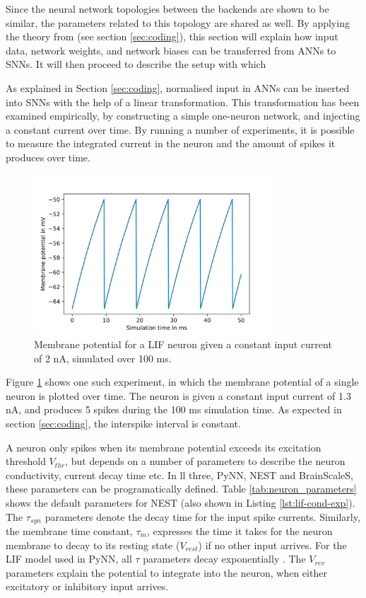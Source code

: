 Since the neural network topologies between the backends are shown to be similar,
the parameters related to this topology are shared as well.
By applying the theory from \textcite{Rueckauer2017} (see section
\ref{sec:coding}), this section will explain how input data, network weights,
and network biases can be transferred from \glspl{ANN} to \glspl{SNN}.
It will then proceed to describe the setup with which 

As explained in Section \ref{sec:coding}, normalised input in \glspl{ANN} can
be inserted into \glspl{SNN} with the help of a linear transformation.
This transformation has been examined empirically, by constructing a simple 
one-neuron network, and injecting a constant current over time.
By running a number of experiments, it is possible to measure the integrated
current in the neuron and the amount of spikes it produces over time.

\begin{figure}
  \centering
  \includegraphics[width=0.8\textwidth]{images/membrane.png}
  \caption{Membrane potential for a LIF neuron given a constant input current of
  2 nA, simulated over 100 ms.}
  \label{fig:membrane}
\end{figure}

Figure \ref{fig:membrane} shows one such experiment, in which the membrane
potential of a single neuron is plotted over time.
The neuron is given a constant input current of 1.3 nA, and 
produces 5 spikes during the 100 ms simulation time. 
As expected in section \ref{sec:coding}, the interspike interval is constant.

A neuron only spikes when its membrane potential exceeds its excitation threshold
$V_{thr}$, but depends on a number of parameters to describe the neuron
conductivity, current decay time etc.
In ll three, PyNN, NEST and BrainScaleS, these parameters can be programatically
defined. Table \ref{tab:neuron_parameters} shows the default parameters for
NEST (also shown in Listing \ref{lst:lif-cond-exp}).
The $\tau_{syn}$ parameters denote the decay time for the input spike currents. 
Similarly, the membrane time constant, $\tau_m$, expresses the time it takes for the
neuron membrane to decay to its resting state ($V_{rest}$) if no other
input arrives. 
For the LIF model used in PyNN,
all $\tau$ parameters decay exponentially \cite{Davison2009}.
The $V_{rev}$ parameters explain the potential to integrate into the neuron,
when either excitatory or inhibitory input arrives. 

